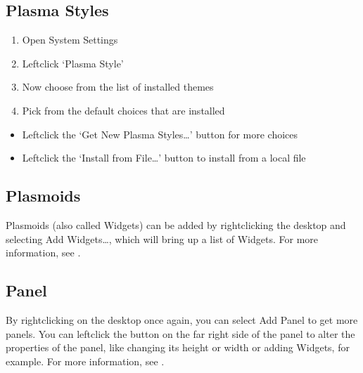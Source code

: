 \documentclass[letterpaper,10pt,english]{sphinxmanual}
\begin{document}
\subsection{Plasma Styles}
\label{\detokenize{docs/desktop-guide/advanced:plasma-styles}}\begin{enumerate}
%
\item {} 
\sphinxAtStartPar
Open System Settings

\item {} 
\sphinxAtStartPar
Left\sphinxhyphen{}click ‘Plasma Style’

\item {} 
\sphinxAtStartPar
Now choose from the list of installed themes

\item {} 
\sphinxAtStartPar
Pick from the default choices that are installed

\end{enumerate}
\begin{itemize}
\item {} 
\sphinxAtStartPar
Left\sphinxhyphen{}click the ‘Get New Plasma Styles…’ button for more choices

\item {} 
\sphinxAtStartPar
Left\sphinxhyphen{}click the ‘Install from File…’ button to install from a local file

\end{itemize}


\subsection{Plasmoids}
\label{\detokenize{docs/desktop-guide/advanced:plasmoids}}
\sphinxAtStartPar
Plasmoids (also called Widgets) can be added by right\sphinxhyphen{}clicking the desktop and selecting Add Widgets…, which will bring up a list of Widgets. For more information, see .


\subsection{Panel}
\label{\detokenize{docs/desktop-guide/advanced:panel}}

\sphinxAtStartPar
By right\sphinxhyphen{}clicking on the desktop once again, you can select Add Panel to get more panels. You can left\sphinxhyphen{}click the button on the far right side of the panel to alter the properties of the panel, like changing its height or width or adding Widgets, for example. For more information, see .
\end{document}
